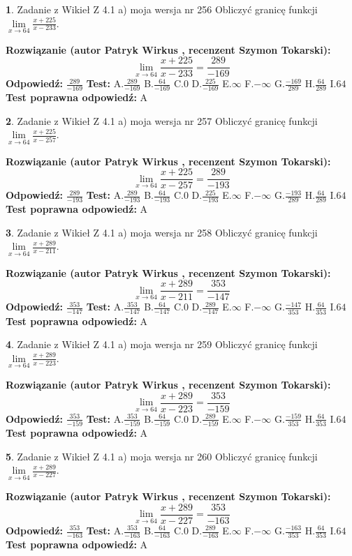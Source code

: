\documentclass[12pt, a4paper]{article}
\theoremstyle{definition} %
\newtheorem{zad}{}
\newcommand{\zadStart}[1]{\begin{zad}#1\newline}
\newcommand{\zadStop}{\end{zad}}
\newcommand{\rozwStart}[2]{\noindent \textbf{Rozwiązanie (autor #1 , recenzent #2): }\newline}
\newcommand{\rozwStop}{\newline}
\newcommand{\odpStart}{\noindent \textbf{Odpowiedź:}\newline}
\newcommand{\odpStop}{\newline}
\newcommand{\testStart}{\noindent \textbf{Test:}\newline}
\newcommand{\testStop}{\newline}
\newcommand{\kluczStart}{\noindent \textbf{Test poprawna odpowiedź:}\newline}
\newcommand{\kluczStop}{\newline}
\begin{document}
\zadStart{Zadanie z Wikieł Z 4.1 a) moja wersja nr 256}
Obliczyć granicę funkcji $\lim\limits_{x\to64}\frac{x+225}{x-233}$.
\zadStop
\rozwStart{Patryk Wirkus}{Szymon Tokarski}
$$\lim\limits_{x\to64}\frac{x+225}{x-233} = \frac{289}{-169}$$
\rozwStop
\odpStart
$\frac{289}{-169}$
\odpStop
\testStart
A.$\frac{289}{-169}$
B.$\frac{64}{-169}$
C.$0$
D.$\frac{225}{-169}$
E.$\infty$
F.$-\infty$
G.$\frac{-169}{289}$
H.$\frac{64}{289}$
I.$64$
\testStop
\kluczStart
A
\kluczStop



\zadStart{Zadanie z Wikieł Z 4.1 a) moja wersja nr 257}
Obliczyć granicę funkcji $\lim\limits_{x\to64}\frac{x+225}{x-257}$.
\zadStop
\rozwStart{Patryk Wirkus}{Szymon Tokarski}
$$\lim\limits_{x\to64}\frac{x+225}{x-257} = \frac{289}{-193}$$
\rozwStop
\odpStart
$\frac{289}{-193}$
\odpStop
\testStart
A.$\frac{289}{-193}$
B.$\frac{64}{-193}$
C.$0$
D.$\frac{225}{-193}$
E.$\infty$
F.$-\infty$
G.$\frac{-193}{289}$
H.$\frac{64}{289}$
I.$64$
\testStop
\kluczStart
A
\kluczStop



\zadStart{Zadanie z Wikieł Z 4.1 a) moja wersja nr 258}
Obliczyć granicę funkcji $\lim\limits_{x\to64}\frac{x+289}{x-211}$.
\zadStop
\rozwStart{Patryk Wirkus}{Szymon Tokarski}
$$\lim\limits_{x\to64}\frac{x+289}{x-211} = \frac{353}{-147}$$
\rozwStop
\odpStart
$\frac{353}{-147}$
\odpStop
\testStart
A.$\frac{353}{-147}$
B.$\frac{64}{-147}$
C.$0$
D.$\frac{289}{-147}$
E.$\infty$
F.$-\infty$
G.$\frac{-147}{353}$
H.$\frac{64}{353}$
I.$64$
\testStop
\kluczStart
A
\kluczStop



\zadStart{Zadanie z Wikieł Z 4.1 a) moja wersja nr 259}
Obliczyć granicę funkcji $\lim\limits_{x\to64}\frac{x+289}{x-223}$.
\zadStop
\rozwStart{Patryk Wirkus}{Szymon Tokarski}
$$\lim\limits_{x\to64}\frac{x+289}{x-223} = \frac{353}{-159}$$
\rozwStop
\odpStart
$\frac{353}{-159}$
\odpStop
\testStart
A.$\frac{353}{-159}$
B.$\frac{64}{-159}$
C.$0$
D.$\frac{289}{-159}$
E.$\infty$
F.$-\infty$
G.$\frac{-159}{353}$
H.$\frac{64}{353}$
I.$64$
\testStop
\kluczStart
A
\kluczStop



\zadStart{Zadanie z Wikieł Z 4.1 a) moja wersja nr 260}
Obliczyć granicę funkcji $\lim\limits_{x\to64}\frac{x+289}{x-227}$.
\zadStop
\rozwStart{Patryk Wirkus}{Szymon Tokarski}
$$\lim\limits_{x\to64}\frac{x+289}{x-227} = \frac{353}{-163}$$
\rozwStop
\odpStart
$\frac{353}{-163}$
\odpStop
\testStart
A.$\frac{353}{-163}$
B.$\frac{64}{-163}$
C.$0$
D.$\frac{289}{-163}$
E.$\infty$
F.$-\infty$
G.$\frac{-163}{353}$
H.$\frac{64}{353}$
I.$64$
\testStop
\kluczStart
A
\kluczStop
\end{document}
